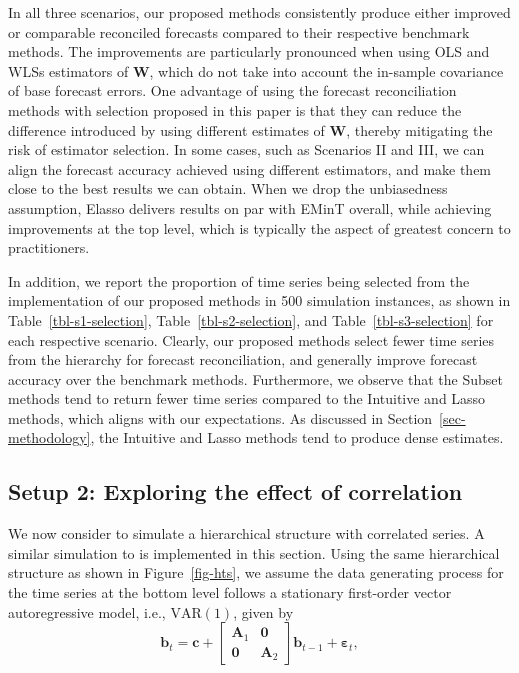\documentclass[11pt,a4paper,]{article}
\begin{document}
In all three scenarios, our proposed methods consistently produce either
improved or comparable reconciled forecasts compared to their respective
benchmark methods. The improvements are particularly pronounced when
using OLS and WLSs estimators of \(\boldsymbol{W}\), which do not take
into account the in-sample covariance of base forecast errors. One
advantage of using the forecast reconciliation methods with selection
proposed in this paper is that they can reduce the difference introduced
by using different estimates of \(\boldsymbol{W}\), thereby mitigating
the risk of estimator selection. In some cases, such as Scenarios II and
III, we can align the forecast accuracy achieved using different
estimators, and make them close to the best results we can obtain. When
we drop the unbiasedness assumption, Elasso delivers results on par with
EMinT overall, while achieving improvements at the top level, which is
typically the aspect of greatest concern to practitioners.

In addition, we report the proportion of time series being selected from
the implementation of our proposed methods in 500 simulation instances,
as shown in Table~\ref{tbl-s1-selection}, Table~\ref{tbl-s2-selection},
and Table~\ref{tbl-s3-selection} for each respective scenario. Clearly,
our proposed methods select fewer time series from the hierarchy for
forecast reconciliation, and generally improve forecast accuracy over
the benchmark methods. Furthermore, we observe that the Subset methods
tend to return fewer time series compared to the Intuitive and Lasso
methods, which aligns with our expectations. As discussed in
Section~\ref{sec-methodology}, the Intuitive and Lasso methods tend to
produce dense estimates.

\hypertarget{sec-sim2}{%
\subsection{Setup 2: Exploring the effect of
correlation}\label{sec-sim2}}

We now consider to simulate a hierarchical structure with correlated
series. A similar simulation to \textcite{Wickramasuriya2021-am} is
implemented in this section. Using the same hierarchical structure as
shown in Figure~\ref{fig-hts}, we assume the data generating process for
the time series at the bottom level follows a stationary first-order
vector autoregressive model, i.e., \(\text{VAR}(1)\), given by \[
\boldsymbol{b}_t= \boldsymbol{c} + \left[\begin{array}{cc}
\boldsymbol{A}_1 & \boldsymbol{0} \\
\boldsymbol{0} & \boldsymbol{A}_2
\end{array}\right] \boldsymbol{b}_{t-1} + \boldsymbol{\varepsilon}_t,
\]
\end{document}
